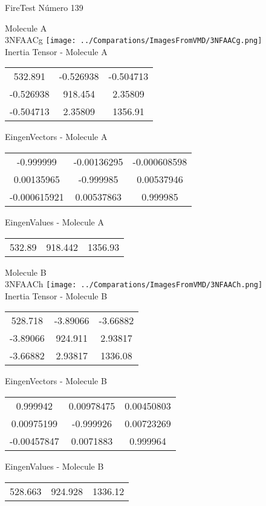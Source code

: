 \vtab[-2cm]
\begin{center}
{\large FireTest \tab Número 139}
\end{center}
\begin{multicols}{2}
\begin{center}

Molecule A \\ 
3NFAACg
\texttt{[image: ../Comparations/ImagesFromVMD/3NFAACg.png]}
\\
Inertia Tensor - Molecule A \\
\vtab

\begin{tabular}{|c c c|}
532.891	 & 	-0.526938	 & 	-0.504713	 \\
-0.526938	 & 	918.454	 & 	2.35809	 \\
-0.504713	 & 	2.35809	 & 	1356.91
\end{tabular}

\vtab
 EingenVectors - Molecule A     \\
\vtab
\begin{tabular}{|c c c|}
-0.999999	 & 	-0.00136295	 & 	-0.000608598	 \\
0.00135965	 & 	-0.999985	 & 	0.00537946	 \\
-0.000615921	 & 	0.00537863	 & 	0.999985
\end{tabular}

\vtab
 EingenValues - Molecule A     \\
\vtab
\begin{tabular}{|c c c|}
532.89	 & 	918.442	 & 	1356.93	 \\
\end{tabular}
\columnbreak

Molecule B \\ 
3NFAACh
\texttt{[image: ../Comparations/ImagesFromVMD/3NFAACh.png]}
\\
Inertia Tensor - Molecule B \\
\vtab

\begin{tabular}{|c c c|}
528.718	 & 	-3.89066	 & 	-3.66882	 \\
-3.89066	 & 	924.911	 & 	2.93817	 \\
-3.66882	 & 	2.93817	 & 	1336.08
\end{tabular}

\vtab
 EingenVectors - Molecule B     \\
\vtab
\begin{tabular}{|c c c|}
0.999942	 & 	0.00978475	 & 	0.00450803	 \\
0.00975199	 & 	-0.999926	 & 	0.00723269	 \\
-0.00457847	 & 	0.0071883	 & 	0.999964
\end{tabular}

\vtab
 EingenValues - Molecule B     \\
\vtab
\begin{tabular}{|c c c|}
528.663	 & 	924.928	 & 	1336.12	 \\
\end{tabular}

\end{center}
\end{multicols}
